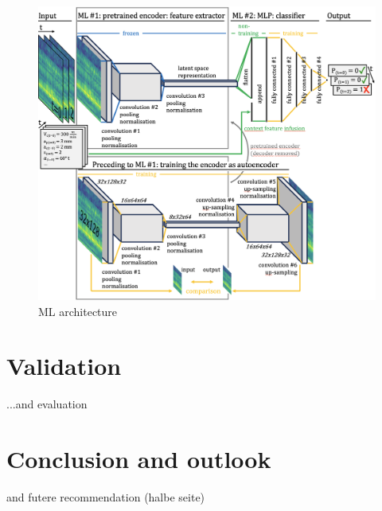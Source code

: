 \documentclass[5p,times,procedia]{elsarticle}
\newenvironment{note}{%
	\noindent
    \color{notecolor}%
}{%
    \par\medskip%
}
\begin{document}
\begin{figure}[t]
    \centering
    \includegraphics[width=0.99\linewidth]{ML_architecture.png}
    \caption{ML architecture}
    \label{ML_architecture}
\end{figure}



 
\section{Validation}
\begin{note}
	...and evaluation

\end{note}
\section{Conclusion and outlook}
\begin{note}
	and futere recommendation (halbe seite)
	
\end{note}





\end{document}
